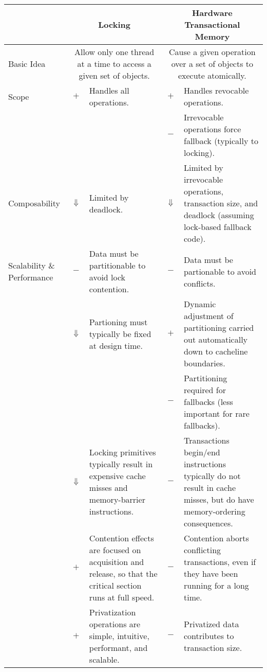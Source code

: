 
\begin{table*}[p]
\begin{center}
\begin{tabular}{p{1.0in}||c|p{2.0in}||c|p{2.0in}}
& \multicolumn{2}{c||}{Locking} & \multicolumn{2}{c}{Hardware Transactional Memory} \\
\hline
\hline
Basic Idea
	& \multicolumn{2}{p{2.2in}||}{
	  Allow only one thread at a time to access a given set of objects.}
		& \multicolumn{2}{p{2.2in}}{
		  Cause a given operation over a set of objects to execute
		  atomically.} \\
\hline
\hline
Scope
	& $+$
	& Handles all operations.
		& $+$
		& Handles revocable operations. \\
\cline{4-5}
	& &
		& $-$
		& Irrevocable operations force fallback (typically
		  to locking). \\
\hline
Composability
	& $\Downarrow$
	& Limited by deadlock.
		& $\Downarrow$
		& Limited by irrevocable operations, transaction size,
		  and deadlock (assuming lock-based fallback code). \\
\hline
Scalability \& Performance
	& $-$
	& Data must be partitionable to avoid lock contention.
		& $-$
		& Data must be partionable to avoid conflicts. \\
\cline{2-5}
	& $\Downarrow$
	& Partioning must typically be fixed at design time.
		& $+$
		& Dynamic adjustment of partitioning carried out
		  automatically down to cacheline boundaries. \\
\cline{4-5}
	&
	&
		& $-$
		& Partitioning required for fallbacks (less important
		  for rare fallbacks). \\
\cline{2-5}
	& $\Downarrow$
	& Locking primitives typically result in expensive cache misses
	  and memory-barrier instructions.
		& $-$
		& Transactions begin/end instructions typically do not
		  result in cache misses, but do have memory-ordering
		  consequences. \\
\cline{2-5}
	& $+$
	& Contention effects are focused on acquisition and release, so
	  that the critical section runs at full speed.
		& $-$
		& Contention aborts conflicting transactions, even
		  if they have been running for a long time. \\
\cline{2-5}
	& $+$
	& Privatization operations are simple, intuitive, performant,
	  and scalable.
		& $-$
		& Privatized data contributes to transaction size. \\

\end{tabular}
\end{center}
\end{table*}
